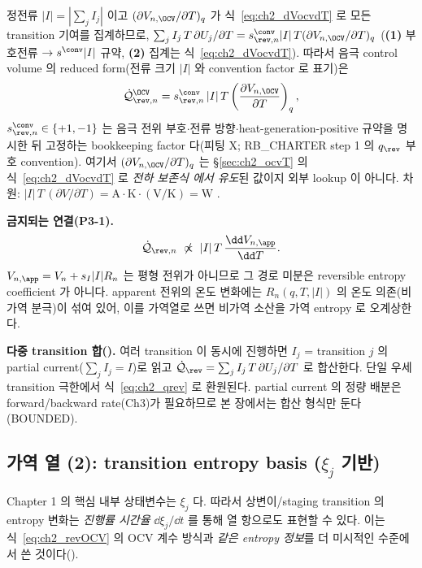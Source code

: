 정전류 $|I|=|\sum_j I_j|$ 이고 $(\partial V_{n,\OCV}/\partial T)_q$ 가 식~\eqref{eq:ch2_dVocvdT} 로 모든 transition
기여를 집계하므로, $\sum_j I_j\,T\,\partial U_j/\partial T=s_{\rev,n}^{\conv}|I|\,T(\partial V_{n,\OCV}/\partial T)_q$
(\textbf{(1)} 부호전류 $\to s^{\conv}|I|$ 규약, \textbf{(2)} 집계는 식~\eqref{eq:ch2_dVocvdT}). 따라서 음극
control volume 의 reduced form(전류 크기 $|I|$ 와 convention factor 로 표기)은
\begin{equation}
\dot{\mathcal Q}_{\rev,n}^{\OCV}=s_{\rev,n}^{\conv}\,|I|\,T\left(\frac{\partial V_{n,\OCV}}{\partial T}\right)_q,
\label{eq:ch2_revOCV}
\end{equation}
$s_{\rev,n}^{\conv}\in\{+1,-1\}$ 는 음극 전위 부호$\cdot$전류 방향$\cdot$heat-generation-positive 규약을 명시한
뒤 고정하는 bookkeeping factor 다(피팅 X; RB\_CHARTER step 1 의 $q_\rev$ 부호 convention). 여기서
$(\partial V_{n,\OCV}/\partial T)_q$ 는 \S\ref{sec:ch2_ocvT} 의 식~\eqref{eq:ch2_dVocvdT} 로 \emph{전하 보존식
에서 유도}된 값이지 외부 lookup 이 아니다. 차원: $|I|\,T\,(\partial V/\partial T)=\mathrm A\cdot\mathrm K\cdot
\mathrm{(V/K)}=\mathrm W$ \checkmark.

\textbf{금지되는 연결(P3-1).}
\begin{equation}
\dot{\mathcal Q}_{\rev,n}\ \not\propto\ |I|\,T\,\frac{\dd V_{n,\app}}{\dd T}.
\label{eq:ch2_forbidden}
\end{equation}
$V_{n,\app}=V_n+s_I|I|R_n$ 는 평형 전위가 아니므로 그 경로 미분은 reversible entropy coefficient 가 아니다.
apparent 전위의 온도 변화에는 $R_n(q,T,|I|)$ 의 온도 의존(비가역 분극)이 섞여 있어, 이를 가역열로 쓰면 비가역
소산을 가역 entropy 로 오계상한다.
\begin{boundbox}
\textbf{다중 transition 합().} 여러 transition 이 동시에 진행하면 $I_j$ = transition $j$ 의 partial
current($\sum_j I_j=I$)로 읽고 $\dot{\mathcal Q}_{\rev}=\sum_j I_j\,T\,\partial U_j/\partial T$ 로 합산한다.
단일 우세 transition 극한에서 식~\eqref{eq:ch2_qrev} 로 환원된다. partial current 의 정량 배분은 forward/backward
rate(Ch3)가 필요하므로 본 장에서는 합산 형식만 둔다(BOUNDED).
\end{boundbox}

\subsection{가역 열 (2): transition entropy basis ($\xi_j$ 기반)}\label{sec:ch2_revxi}
Chapter 1 의 핵심 내부 상태변수는 $\xi_j$ 다. 따라서 상변이/staging transition 의 entropy 변화는 \emph{진행률
시간율} $\dd\xi_j/\dd t$ 를 통해 열 항으로도 표현할 수 있다. 이는 식~\eqref{eq:ch2_revOCV} 의 OCV 계수 방식과
\emph{같은 entropy 정보}를 더 미시적인 수준에서 쓴 것이다().

